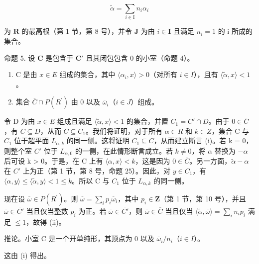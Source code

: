 \[
\tilde {\alpha} = \sum_ {i \in \mathrm{I}} n _ {i} \alpha_ {i}
\]

为 \(\mathbf{R}\) 的最高根（第 1 节，第 8 号），并令 \(\mathbf{J}\) 为由 \(i \in \mathbf{I}\) 且满足 \(n_i = 1\) 的 i 所成的集合。

命题 5. 设 \(\mathbf{C}\) 是包含于 \(\mathbf{C}'\) 且其闭包包含 0 的小室（命题 4）。

\begin{enumerate}
\def\labelenumi{(\roman{enumi})}
\tightlist
\item
  C 是由 \(x \in E\) 组成的集合，其中 \(\langle\alpha_{i}, x\rangle > 0\)（对所有 \(i \in I\)），且有 \(\langle\tilde{\alpha}, x\rangle < 1\)。
\item
  集合 \(\overline{C} \cap P(R^{\prime})\) 由 0 以及 \(\overline{\omega}_{i}\)（\(i \in J\)）组成。
\end{enumerate}

令 D 为由 \(x \in E\) 组成且满足 \(\langle\tilde{\alpha}, x\rangle < 1\) 的集合，并置 \(C_{1} = C' \cap D\)。由于 \(0 \in \overline{C}\)，有 \(C \subseteq D\)，从而 \(C \subseteq C_{1}\)。我们将证明，对于所有 \(\alpha \in R\) 和 \(k \in Z\)，集合 C 与 \(C_{1}\) 位于超平面 \(L_{\alpha,k}\) 的同一侧。这将证明 \(C_{1} \subseteq C\)，从而建立断言 (i)。若 k = 0，则整个室 \(C'\) 位于 \(L_{\alpha,0}\) 的一侧，在此情形断言成立。若 \(k \neq 0\)，将 \(\alpha\) 替换为 \(-\alpha\) 后可设 k \textgreater{} 0。于是，在 C 上有 \(\langle\alpha, x\rangle < k\)，这是因为 \(0 \in \overline{C}\)。另一方面，\(\tilde{\alpha} - \alpha\) 在 \(C'\) 上为正（第 1 节，第 8 号，命题 25）。因此，对 \(y \in C_{1}\)，有 \(\langle\alpha, y\rangle \leqslant \langle\tilde{\alpha}, y\rangle < 1 \leqslant k\)。所以 C 与 \(C_{1}\) 位于 \(L_{\alpha,k}\) 的同一侧。

现在设 \(\overline{\omega} \in P(R^{\prime})\)。则 \(\overline{\omega} = \sum_{i} p_i \overline{\omega}_i\)，其中 \(p_i \in \mathbf{Z}\)（第 1 节，第 10 号），并且 \(\overline{\omega} \in \overline{C'}\) 当且仅当整数 \(p_i\) 为正。若 \(\overline{\omega} \in \overline{C'}\)，则 \(\overline{\omega} \in \overline{C}\) 当且仅当 \(\langle \tilde{\alpha}, \overline{\omega} \rangle = \sum_{i} n_i p_i\) 满足 \(\leqslant 1\)，故得 (ii)。

推论。小室 C 是一个开单纯形，其顶点为 0 以及 \(\overline{\omega}_i / n_i\)（\(i \in I\)）。

这由 (i) 得出。

